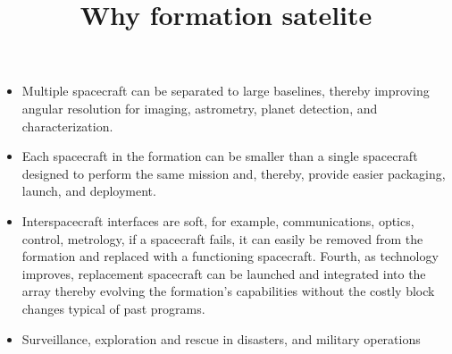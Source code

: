 \documentclass{article}
\title{Why formation satelite}
\begin{document}
\maketitle
\begin{itemize}
	\item Multiple spacecraft can be separated to large baselines, thereby improving angular resolution for imaging, astrometry, planet detection, and characterization.
	\item Each spacecraft in the formation can be smaller than a single spacecraft designed to perform the same mission and, thereby, provide easier packaging, launch, and deployment.
	\item Interspacecraft interfaces are soft, for example, communications, optics, control, metrology, if a spacecraft fails, it can easily be removed from the formation and replaced with a functioning spacecraft. Fourth, as technology improves, replacement spacecraft can be launched and integrated into the array thereby evolving the formation’s capabilities without the costly block changes typical of past programs.
	\item Surveillance, exploration and rescue in disasters, and military operations
\end{itemize}
\end{document}
